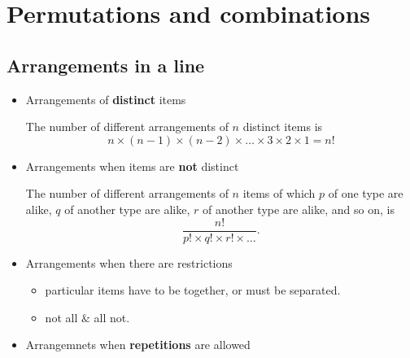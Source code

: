 \newpage
\section{Permutations and combinations}
\subsection{Arrangements in a line}

\begin{itemize}
	\setlength\itemsep{0.5em}
	\item Arrangements of \textbf{distinct} items	
	
	The number of different arrangements of $n$ distinct items is 
	\[
	n \times (n-1) \times (n-2) \times \ldots \times 3 \times 2 \times 1 = n!	\]
	\item Arrangements when items are \textbf{not} distinct
	
	The number of different arrangements of $n$ items of which $p$ of one type are alike, $q$ of another type are alike, $r$ of another type are alike, and so on, is 
	\[
	\frac{n!}{p!\times q! \times r!\times \ldots}.
	\]
	\item Arrangements when there are restrictions
	\begin{itemize}
			\setlength\itemsep{0.5em}
		\item particular items have to be together, or must be separated.
		\item not all $\&$ all not.
	\end{itemize}
	
	\item Arrangemnets when \textbf{repetitions} are allowed
\end{itemize}

\exercise   %

